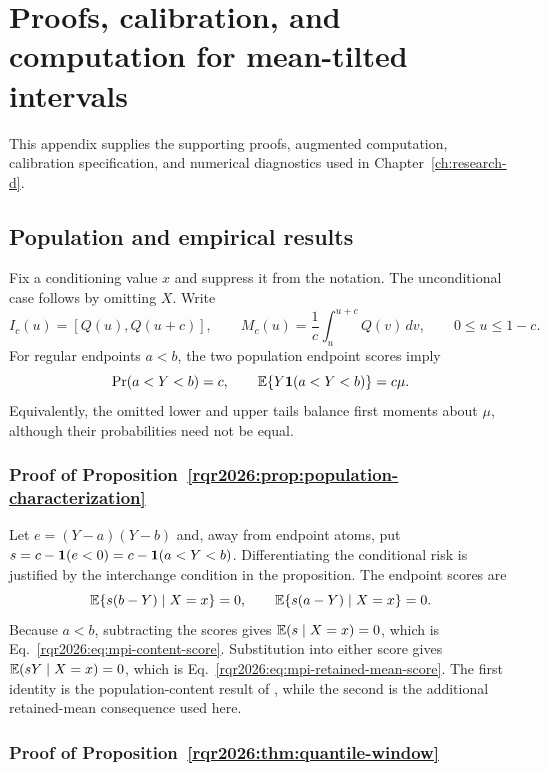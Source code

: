 \chapter{Proofs, calibration, and computation for mean-tilted intervals}
\label{app:mti-technical}

This appendix supplies the supporting proofs, augmented computation,
calibration specification, and numerical diagnostics used in
Chapter~\ref{ch:research-d}.

\section{Population and empirical results}
\label{app:mti-proofs}

Fix a conditioning value \(x\) and suppress it from the notation. The
unconditional case follows by omitting \(X\). Write
\[
I_c(u)=[Q(u),Q(u+c)],
\qquad
M_c(u)=\frac1c\int_u^{u+c}Q(v)\,dv,
\qquad 0\le u\le1-c.
\]
For regular endpoints \(a<b\), the two population endpoint scores imply
\[
\Pr(a<Y<b)=c,
\qquad
\mathbb{E}\{Y\mathbf{1}(a<Y<b)\}=c\mu.
\]
Equivalently, the omitted lower and upper tails balance first moments about
\(\mu\), although their probabilities need not be equal.

\subsection{Proof of Proposition~\ref{rqr2026:prop:population-characterization}}

Let \(e=(Y-a)(Y-b)\) and, away from endpoint atoms, put
\(s=c-\mathbf{1}(e<0)=c-\mathbf{1}(a<Y<b)\). Differentiating the conditional risk is
justified by the interchange condition in the proposition. The endpoint
scores are
\[
\mathbb{E}\{s(b-Y)\mid X=x\}=0,
\qquad
\mathbb{E}\{s(a-Y)\mid X=x\}=0.
\]
Because \(a<b\), subtracting the scores gives
\(\mathbb{E}(s\mid X=x)=0\), which is
Eq.~\eqref{rqr2026:eq:mpi-content-score}. Substitution into either score gives
\(\mathbb{E}(sY\mid X=x)=0\), which is
Eq.~\eqref{rqr2026:eq:mpi-retained-mean-score}. The first identity is the
population-content result of \citet{rqr-PouplinEtAl2024RQR}, while the second is the
additional retained-mean consequence used here.

\subsection{Proof of Proposition~\ref{rqr2026:thm:quantile-window}}

